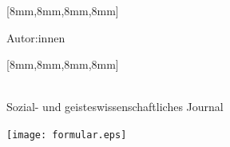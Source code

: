 \documentclass[
    coverwidth=160mm,
    coverheight=227mm,
    spinewidth=9mm,
    markcolor=black,
    marklength=8mm,
    trimmed=true,
    ]
    {bookcover}
\begin{document}
    \begin{bookcover}
   
        [8mm,8mm,8mm,8mm]{
            
            \vspace*{.5cm}
            \begin{center}  
            {\bdiinnerfont Autor:innen}\\ \vspace{20pt}
            \end{center}
            \vspace*{.5cm}
            \begin{multicols}{2}
                \begin{authordescription}[leftmargin=0pt, itemindent=.0cm]
                    
                \end{authordescription}
            \end{multicols}
        }

        [8mm,8mm,8mm,8mm]{
            \vspace*{.5cm}
            \begin{center}  
            {\bdiinnerfont \bdiReleaseTitle\\ Sozial- und geisteswissenschaftliches Journal\vspace{20pt}}
            \end{center}
            \vspace*{.5cm}
            \begin{multicols*}{2}
                \begin{authordescription}[leftmargin=0pt, itemindent=.0cm]
                    
                \end{authordescription}
            \end{multicols*}
            \begin{center}
                \texttt{[image: formular.eps]}
            \end{center}
        }
    \end{bookcover}
\end{document}
